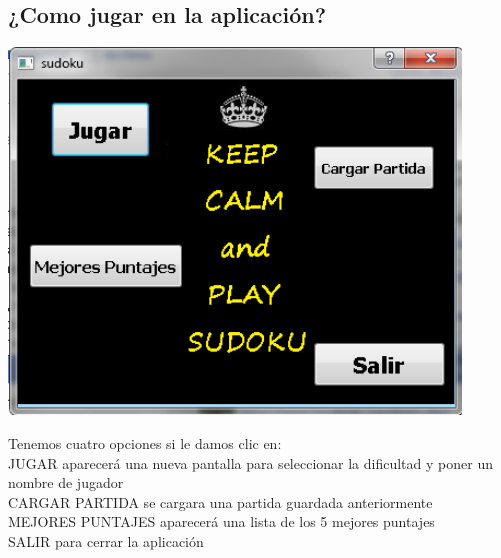 \documentclass[12pt]{extbook}
\begin{document}
\begin{center}
\section{¿Como jugar en la aplicación?}
\end{center}
\begin{center}
\includegraphics[width=12cm]{inicio.png}
\end{center}
Tenemos cuatro opciones si le damos clic en:\\
JUGAR aparecerá una nueva pantalla para seleccionar la dificultad y poner un nombre de jugador\\
CARGAR PARTIDA se cargara una partida guardada anteriormente\\
MEJORES PUNTAJES aparecerá una lista de los 5 mejores puntajes\\
SALIR para cerrar la aplicación\\
\end{document}
